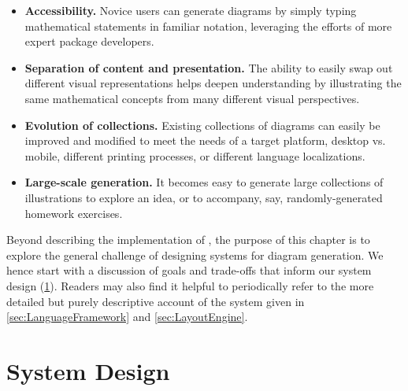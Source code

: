 \begin{itemize}
   \item \textbf{Accessibility.} Novice users can generate diagrams by simply typing mathematical statements in familiar notation, leveraging the efforts of more expert package developers.
   \item \textbf{Separation of content and presentation.} The ability to easily swap out different visual representations helps deepen understanding by illustrating the same mathematical concepts from many different visual perspectives.
   \item \textbf{Evolution of collections.} Existing collections of diagrams can easily be improved and modified to meet the needs of a target platform, \eg{} desktop vs. mobile, different printing processes, or different language localizations.
   \item \textbf{Large-scale generation.} It becomes easy to generate large collections of illustrations to explore an idea, or to accompany, say, randomly-generated homework exercises.
\end{itemize}

Beyond describing the implementation of \Penrose{}, the purpose of this chapter is to explore the general challenge of designing systems for diagram generation. We hence start with a discussion of goals and trade-offs that inform our system design (\cref{sec:SystemDesign}). Readers may also find it helpful to periodically refer to the more detailed but purely descriptive account of the system given in \cref{sec:LanguageFramework} and \cref{sec:LayoutEngine}.

\section{System Design}
\label{sec:SystemDesign}


